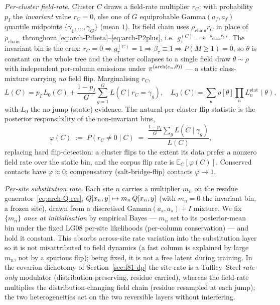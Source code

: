 \emph{Per-cluster field-rate.} Cluster $C$ draws a field-rate multiplier
$r_C$: with probability $p_I$ the \emph{invariant} value $r_C = 0$, else
one of $G$ equiprobable Gamma$(a_f, a_f)$ quantile midpoints
$\{\gamma_1,\dots,\gamma_G\}$ (mean $1$). Its field chain uses
$\rho_{\text{chain}} r_C$ in place of $\rho_{\text{chain}}$ throughout
\eqref{eq:arch-Ptheta}--\eqref{eq:arch-P2plus}, i.e.\ $g^{(C)}_\tau =
e^{-\rho_{\text{chain}} r_C \tau}$. The invariant bin is the crux: $r_C =
0 \Rightarrow g^{(C)}_\tau = 1 \Rightarrow \beta_\tau \equiv 1 \Rightarrow
P(M{\ge}1) = 0$, so $\theta$ is constant on the whole tree and the
cluster collapses to a single field draw $\theta \sim \rho$ with
independent per-column emissions under $\pi^{(\mathrm{arch}(c_n,\theta))}$ --- a
static class-mixture carrying \emph{no} field flip. Marginalising $r_C$,
\begin{equation}
  L(C) = p_I\, L_0(C) + \frac{1 - p_I}{G} \sum_{g=1}^{G} L\!\left(C \mid r_C = \gamma_g\right),
  \quad
  L_0(C) = \sum_\theta \rho[\theta] \prod_n L_n^{\mathrm{stat}}(\theta),
  \label{eq:rate-het-field-marg}
\end{equation}
with $L_0$ the no-jump (static) evidence. The natural per-cluster flip
statistic is the posterior responsibility of the non-invariant bins,
\begin{equation}
  \varphi(C) \;:=\; P(r_C \neq 0 \mid C)
  \;=\; \frac{\tfrac{1-p_I}{G}\sum_g L(C \mid \gamma_g)}{L(C)},
  \label{eq:flip-posterior}
\end{equation}
replacing hard flip-detection: a cluster flips to the extent its data
prefer a nonzero field rate over the static bin, and the corpus flip
rate is $\mathbb{E}_C[\varphi(C)]$. Conserved contacts have
$\varphi \approx 0$; compensatory (salt-bridge-flip) contacts
$\varphi \to 1$.

\emph{Per-site substitution rate.} Each site $n$ carries a multiplier
$m_n$ on the residue generator~\eqref{eq:arch-Q-res},
$Q[x_n, y] \mapsto m_n\,Q[x_n, y]$ (with $m_n = 0$ the invariant
bin, a frozen site), drawn from a discretised Gamma$(a_s, a_s){+}I$
mixture. We fix $\{m_n\}$ \emph{once at initialisation} by empirical
Bayes --- $m_n$ set to its posterior-mean bin under the fixed LG08
per-site likelihoods (per-column conservation) --- and hold it constant.
This absorbs across-site rate variation into the substitution layer so
it is not misattributed to field dynamics (a fast column is explained by
large $m_n$, not by a spurious flip); being fixed, it is not a free
latent during training. In the covarion dichotomy of
Section~\ref{sec:f81-dp} the site-rate is a Tuffley--Steel
\emph{rate-only} modulator (distribution-preserving, residue carried),
whereas the field-rate multiplies the distribution-changing field chain
(residue resampled at each jump); the two heterogeneities act on the two
reversible layers without interfering.

